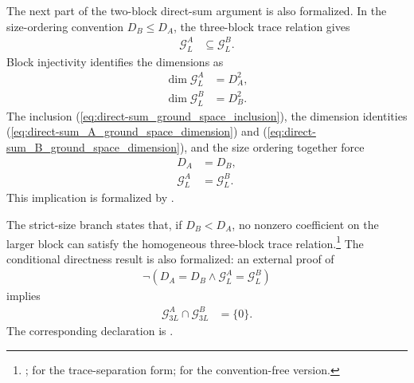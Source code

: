 \documentclass{article}
\begin{document}
The next part of the two-block direct-sum argument is also formalized. In the
size-ordering convention $D_B\leq D_A$, the three-block trace relation gives
\begin{align}
    \mathcal G_L^A
     & \subseteq\mathcal G_L^B.
    \label{eq:direct-sum_ground_space_inclusion}
\end{align}
Block injectivity identifies the dimensions as
\begin{align}
    \dim\mathcal G_L^A
     & =D_A^2,
    \label{eq:direct-sum_A_ground_space_dimension} \\
    \dim\mathcal G_L^B
     & =D_B^2.
    \label{eq:direct-sum_B_ground_space_dimension}
\end{align}
The inclusion
(\ref{eq:direct-sum_ground_space_inclusion}), the dimension identities
(\ref{eq:direct-sum_A_ground_space_dimension}) and
(\ref{eq:direct-sum_B_ground_space_dimension}), and the size ordering together
force
\begin{align}
    D_A
     & =D_B,
    \label{eq:direct-sum_forced_equal_bond_dimension} \\
    \mathcal G_L^A
     & =\mathcal G_L^B.
    \label{eq:direct-sum_forced_equal_ground_spaces}
\end{align}
This implication is formalized by
.

The strict-size branch states that, if $D_B<D_A$, no nonzero coefficient on
the larger block can satisfy the homogeneous three-block trace
relation.\footnote{%
    ;
    for the trace-separation form;
    for the convention-free version.}
The conditional directness result is also formalized: an external proof of
\begin{align}
    \neg\left(D_A=D_B
    \mathbin{\wedge}
    \mathcal G_L^A=\mathcal G_L^B\right)
    \label{eq:direct-sum_excluded_equal_size_collapse}
\end{align}
implies
\begin{align}
    \mathcal G_{3L}^A\cap\mathcal G_{3L}^B
     & =\{0\}.
    \label{eq:direct-sum_three_block_zero_intersection}
\end{align}
The corresponding declaration is
.
\end{document}
